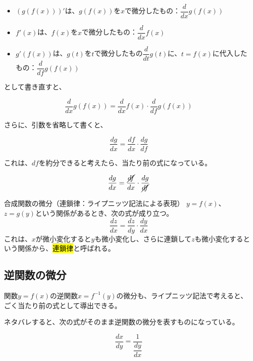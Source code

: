 \documentclass[../../imaging-math]{subfiles}
\begin{document}
\begin{itemize}
  \item $\left( g(f(x)) \right)'$は、$g(f(x))$を$x$で微分したもの：$\dfrac{d}{dx} g(f(x))$
  \item $f'(x)$は、$f(x)$を$x$で微分したもの：$\dfrac{d}{dx} f(x)$
  \item $g'(f(x))$は、$g(t)$を$t$で微分したもの$\dfrac{d}{dt} g(t)$に、$t=f(x)$に代入したもの：$\dfrac{d}{df}g(f(x))$
\end{itemize}

として書き直すと、

\begin{equation}
  \dfrac{d}{dx} g(f(x)) = \dfrac{d}{dx}f(x) \cdot \dfrac{d}{df}g(f(x))
\end{equation}

さらに、引数を省略して書くと、

\begin{equation}
  \frac{dg}{dx} = \frac{df}{dx} \cdot \frac{dg}{df}
\end{equation}

これは、$df$を約分できると考えたら、当たり前の式になっている。

\begin{equation}
  \frac{dg}{dx} = \frac{\cancel{df}}{dx} \cdot \frac{dg}{\cancel{df}}
\end{equation}

\begin{theorem}{合成関数の微分（連鎖律：ライプニッツ記法による表現）}
  \titlegap
  $y=f(x)$、$z=g(y)$という関係があるとき、次の式が成り立つ。
  \LARGE
  \begin{equation}
    \frac{dz}{dx} = \frac{dz}{dy} \cdot \frac{dy}{dx}
  \end{equation}
  \normalsize
  これは、$x$が微小変化すると$y$も微小変化し、さらに連鎖して$z$も微小変化するという関係から、\hl{連鎖律}と呼ばれる。
\end{theorem}

\subsection{逆関数の微分}

関数$y=f(x)$の逆関数$x = f^{-1}(y)$の微分も、ライプニッツ記法で考えると、ごく当たり前の式として導出できる。

ネタバレすると、次の式がそのまま逆関数の微分を表すものになっている。

\begin{equation}
  \dfrac{dx}{dy} = \dfrac{1}{\dfrac{dy}{dx}}
\end{equation}
\end{document}

